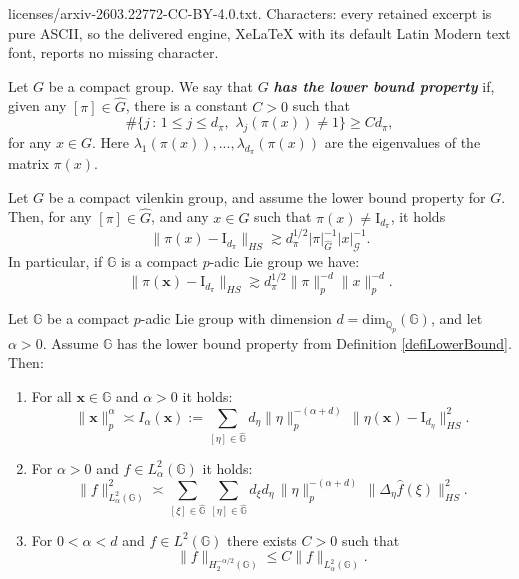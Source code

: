 \documentclass[10pt,a4paper]{amsart}
\newcommand{\G}{\mathbb{G}}
\newcommand{\Q}{\mathbb{Q}}
\begin{document}
licenses/arxiv-2603.22772-CC-BY-4.0.txt. Characters: every retained excerpt is pure ASCII, so the delivered engine, XeLaTeX with its default Latin Modern text font, reports no missing character.
\begin{defi}\label{defiLowerBound}
    Let $G$ be a compact group. We say that $G$ \textbf{\emph{has the lower bound property}} if, given any $[\pi] \in \widehat{G}$, there is a constant $C>0$ such that $$\# \{ j \, : \, 1 \leq j \leq d_\pi, \,\, \lambda_j (\pi(x)) \neq 1 \} \geq C d_\pi, $$for any $x \in G$. Here $\lambda_1 (\pi(x)), ..., \lambda_{d_\pi} (\pi(x))$ are the eigenvalues of the matrix $\pi(x)$.
\end{defi}

\begin{lema}\label{lemaLowerBoundVilenkin}
    Let $G$ be a compact vilenkin group, and assume the lower bound property for $G$. Then, for any $[\pi] \in \widehat{G}$, and any $x \in G$ such that $\pi(x) \neq \mathrm{I}_{d_\pi}$, it holds \[
\|\pi(x) - \mathrm{I}_{d_\pi} \|_{HS} \gtrsim d_\pi^{1/2} |\pi|_{\widehat{G}}^{-1} |x|_{\mathcal{G}}^{-1}.
\]In particular, if $\G$ is a compact $p$-adic Lie group we have: \[
\|\pi(\mathbf{x}) - \mathrm{I}_{d_\pi} \|_{HS} \gtrsim d_\pi^{1/2} \|\pi\|^{-d}_p \|x\|^{-d}_p.
\]
\end{lema}

\begin{lema}\label{lemma3.1}
Let $\G$ be a compact $p$-adic Lie group with dimension $d= \mathrm{dim}_{\Q_p} (\G)$, and let $\alpha > 0$. Assume $\G$ has the lower bound property from Definition \ref{defiLowerBound}. Then:
\begin{enumerate}
    \item[(i)] For all $\mathbf{x} \in \mathbb{G}$ and $\alpha > 0$ it holds:
    \[
    \|\mathbf{x}\|_{p}^\alpha \asymp I_\alpha(\mathbf{x}) := 
    \sum_{[\eta] \in \widehat{\G}} 
    d_\eta \|\eta\|_p^{-(\alpha+d)}  \, \|\eta(\mathbf{x}) - \mathrm{I}_{d_\eta} \|^2_{HS} .
    \]

    \item[(ii)] For $\alpha > 0$ and $f \in L^2_\alpha(\mathbb{G})$ it holds:
    \[
    \| f \|^2_{L^2_\alpha(\mathbb{G})} \asymp 
    \sum_{[\xi] \in \widehat{\mathbb{G}}} 
    \sum_{[\eta] \in \widehat{\mathbb{G}}}
    d_\xi d_\eta \, 
    \|\eta\|_p^{-(\alpha+d)} \, 
    \|\Delta_{\eta} \hat{f}(\xi)\|^2_{HS}.
    \]

    \item[(iii)] For $0 < \alpha < d$ and $f \in L^2(\mathbb{G})$ there exists $C>0$ such that
    \[
    \|f\|_{H^{- \alpha/2}_2(\mathbb{G})} \leq C \|f\|_{L^2_\alpha(\mathbb{G})}.
    \]
\end{enumerate}
\end{lema}
\end{document}
